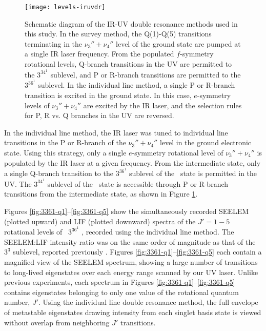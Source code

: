 \begin{figure}
  \centering
  
  \texttt{[image: levels-iruvdr]}

  \caption{Schematic diagram of the IR-UV double resonance methods
    used in this study.  In the survey method, the Q(1)-Q(5)
    transitions terminating in the $\nu_3''+\nu_4''$ level of the
    ground state are pumped at a single IR laser frequency.  From the
    populated $f$-symmetry rotational levels, Q-branch transitions in
    the UV are permitted to the $3^34^1$  sublevel, and P or
    R-branch transitions are permitted to the $3^36^1$ 
    sublevel.  In the individual line method, a single P or R-branch
    transition is excited in the ground state.  In this case,
    $e$-symmetry levels of $\nu_3''+\nu_4''$ are excited by the IR
    laser, and the selection rules for P, R vs. Q branches in the UV
    are reversed.}
  \label{fig:levels-iruvdr}
\end{figure}

In the individual line method, the IR laser was tuned to individual line
transitions in the P or R-branch of the $\nu_3''+\nu_4''$ level in the
ground electronic state.  Using this strategy, only a single
$e$-symmetry rotational level of $\nu_3''+\nu_4''$ is populated by the
IR laser at a given frequency.  From the intermediate state, only a
single Q-branch transition to the $3^36^1$  sublevel of the
\astate\ state is permitted in the UV.  The $3^34^1$  sublevel
of the \astate\ state is accessible through P or R-branch transitions
from the intermediate state, as shown in Figure
\ref{fig:levels-iruvdr}.


Figures \ref{fig:3361-q1}--\ref{fig:3361-q5} show the simultaneously
recorded SEELEM (plotted upward) and LIF (plotted downward) spectra of
the $J'=1-5$ rotational levels of \astate\ $3^36^1$ , recorded
using the individual line method.  The SEELEM:LIF intensity ratio was on
the same order of magnitude as that of the $3^3$  sublevel,
reported previously \cite{mishra04}. Figures
\ref{fig:3361-q1}--\ref{fig:3361-q5} each contain a magnified view of
the SEELEM spectrum, showing a large number of transitions to
long-lived eigenstates over each energy range scanned by our UV laser.
Unlike previous experiments, each spectrum in Figures
\ref{fig:3361-q1}--\ref{fig:3361-q5} contains eigenstates belonging to only
one value of the rotational quantum number, $J'$.  Using the individual line
double resonance method, the full envelope of metastable eigenstates
drawing intensity from each singlet basis state is viewed without
overlap from neighboring $J'$ transitions.

